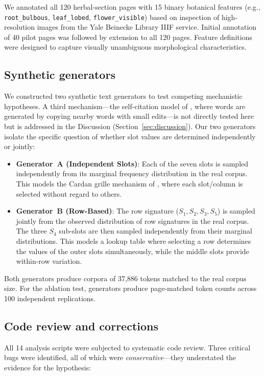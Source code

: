 \documentclass[12pt]{article}
\begin{document}
We annotated all 120 herbal-section pages with 15 binary botanical features (e.g., \texttt{root\_bulbous}, \texttt{leaf\_lobed}, \texttt{flower\_visible}) based on inspection of high-resolution images from the Yale Beinecke Library IIIF service. Initial annotation of 40 pilot pages was followed by extension to all 120 pages. Feature definitions were designed to capture visually unambiguous morphological characteristics.

\subsection{Synthetic generators}
\label{sec:generators}

We constructed two synthetic text generators to test competing mechanistic hypotheses. A third mechanism---the self-citation model of \citet{Timm2020}, where words are generated by copying nearby words with small edits---is not directly tested here but is addressed in the Discussion (Section~\ref{sec:discussion}). Our two generators isolate the specific question of whether slot values are determined independently or jointly:

\begin{itemize}
  \item \textbf{Generator~A (Independent Slots)}: Each of the seven slots is sampled independently from its marginal frequency distribution in the real corpus. This models the Cardan grille mechanism of \citet{Rugg2004}, where each slot/column is selected without regard to others.
  \item \textbf{Generator~B (Row-Based)}: The row signature ($S_1, S_2, S_3, S_5$) is sampled jointly from the observed distribution of row signatures in the real corpus. The three $S_4$ sub-slots are then sampled independently from their marginal distributions. This models a lookup table where selecting a row determines the values of the outer slots simultaneously, while the middle slots provide within-row variation.
\end{itemize}

Both generators produce corpora of 37,886 tokens matched to the real corpus size. For the ablation test, generators produce page-matched token counts across 100 independent replications.

\subsection{Code review and corrections}

All 14 analysis scripts were subjected to systematic code review. Three critical bugs were identified, all of which were \emph{conservative}---they understated the evidence for the hypothesis:
\end{document}
